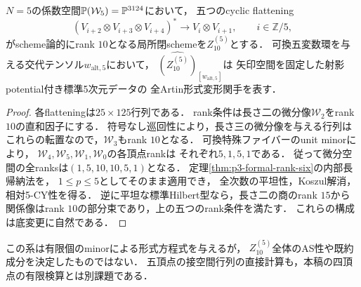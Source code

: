 \begin{corollary}[五頂点ambientの可換点の形式方程式]
\label{cor:p4-formal-rank-ten}
$N=5$の係数空間$\mathbb P(\mathcal W_5)=\mathbb P^{3124}$において，
五つのcyclic flattening
\[
 (V_{i+2}\otimes V_{i+3}\otimes V_{i+4})^*
   \longrightarrow V_i\otimes V_{i+1},
 \qquad i\in\mathbb Z/5,
\]
がscheme論的にrank $10$となる局所閉schemeを$Z_{10}^{(5)}$とする．
可換五変数環を与える交代テンソル$w_{\mathrm{alt},5}$において，
$\widehat{(Z_{10}^{(5)})}_{[w_{\mathrm{alt},5}]}$は
矢印空間を固定した射影potential付き標準5次元データの
全Artin形式変形関手を表す．
\end{corollary}
\begin{proof}
各flatteningは$25\times125$行列である．
rank条件は長さ二の微分像$\mathcal W_2$をrank $10$の直和因子にする．
符号なし巡回性により，長さ三の微分像を与える行列は
これらの転置なので，$\mathcal W_3$もrank $10$となる．
可換特殊ファイバーのunit minorにより，
$\mathcal W_4,\mathcal W_5,\mathcal W_1,\mathcal W_0$の各頂点rankは
それぞれ$5,1,5,1$である．
従って微分空間の全ranksは$(1,5,10,10,5,1)$となる．
定理\ref{thm:p3-formal-rank-six}の内部長帰納法を，
$1\le p\le5$としてそのまま適用でき，
全次数の平坦性，Koszul解消，相対5-CY性を得る．
逆に平坦な標準Hilbert型なら，長さ二の商のrank $15$から
関係像はrank $10$の部分束であり，上の五つのrank条件を満たす．
これらの構成は底変更に自然である．
\end{proof}

この系は有限個のminorによる形式方程式を与えるが，
$Z_{10}^{(5)}$全体のAS性や既約成分を決定したものではない．
五頂点の接空間行列の直接計算も，本稿の四頂点の有限検算とは別課題である．
